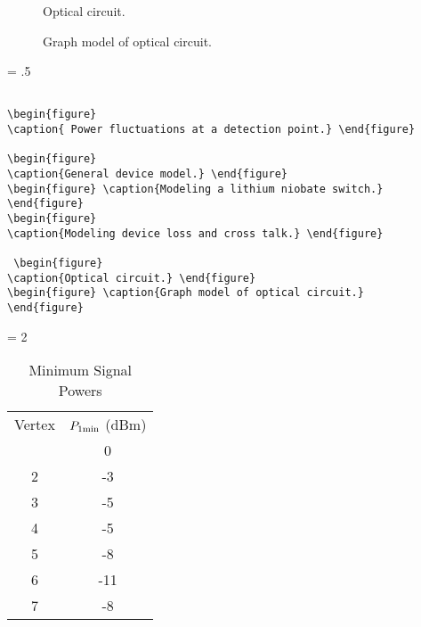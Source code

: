  \begin{figure}
\caption{Optical circuit.} \end{figure}
\begin{figure} \caption{Graph model of optical circuit.}
\end{figure}

\newpage
\baselineskip = .5\baselineskip  %
\begin{verbatim}

\begin{figure}
\caption{ Power fluctuations at a detection point.} \end{figure}

\begin{figure}
\caption{General device model.} \end{figure}
\begin{figure} \caption{Modeling a lithium niobate switch.}
\end{figure}
\begin{figure}
\caption{Modeling device loss and cross talk.} \end{figure}

 \begin{figure}
\caption{Optical circuit.} \end{figure}
\begin{figure} \caption{Graph model of optical circuit.}
\end{figure}

\end{verbatim}
\newpage
\baselineskip = 2\baselineskip  %


\begin{table}
\caption{Minimum Signal Powers}
\begin{tabular}{cc}
Vertex&$P_{1\rm min} $ (dBm) \\ \tableline
  1 &           0   \\                             2 &          -3
 \\                             3 &          -5   \\
              4 &          -5   \\                             5 &
        -8   \\                             6 &          -11  \\
                          7 &          -8
\end{tabular}
\end{table}

